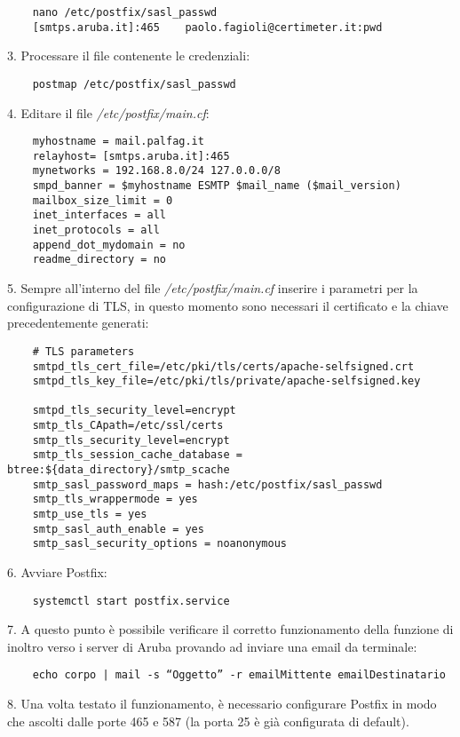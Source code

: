 \begin{verbatim}
    nano /etc/postfix/sasl_passwd
    [smtps.aruba.it]:465    paolo.fagioli@certimeter.it:pwd
\end{verbatim}
3. Processare il file contenente le credenziali:

\begin{verbatim}
    postmap /etc/postfix/sasl_passwd
\end{verbatim}
4. Editare il file \textit{/etc/postfix/main.cf}:

\begin{verbatim}
    myhostname = mail.palfag.it
    relayhost= [smtps.aruba.it]:465
    mynetworks = 192.168.8.0/24 127.0.0.0/8
    smpd_banner = $myhostname ESMTP $mail_name ($mail_version)
    mailbox_size_limit = 0
    inet_interfaces = all
    inet_protocols = all
    append_dot_mydomain = no
    readme_directory = no
\end{verbatim}
5. Sempre all'interno del file \textit{/etc/postfix/main.cf} inserire i parametri per la configurazione di TLS,
in questo momento sono necessari il certificato e la chiave precedentemente generati:

\begin{verbatim}
    # TLS parameters
    smtpd_tls_cert_file=/etc/pki/tls/certs/apache-selfsigned.crt
    smtpd_tls_key_file=/etc/pki/tls/private/apache-selfsigned.key

    smtpd_tls_security_level=encrypt
    smtp_tls_CApath=/etc/ssl/certs
    smtp_tls_security_level=encrypt
    smtp_tls_session_cache_database = btree:${data_directory}/smtp_scache
    smtp_sasl_password_maps = hash:/etc/postfix/sasl_passwd
    smtp_tls_wrappermode = yes
    smtp_use_tls = yes
    smtp_sasl_auth_enable = yes
    smtp_sasl_security_options = noanonymous
\end{verbatim}
6. Avviare Postfix:
\begin{verbatim}
    systemctl start postfix.service
\end{verbatim}
7. A questo punto è possibile verificare il corretto funzionamento della funzione di inoltro verso i server di Aruba 
provando ad inviare una email da terminale:

\begin{verbatim}
    echo corpo | mail -s “Oggetto” -r emailMittente emailDestinatario 
\end{verbatim}
8. Una volta testato il funzionamento, è necessario configurare Postfix in modo che ascolti dalle porte 465 e 587 
(la porta 25 è già configurata di default).

